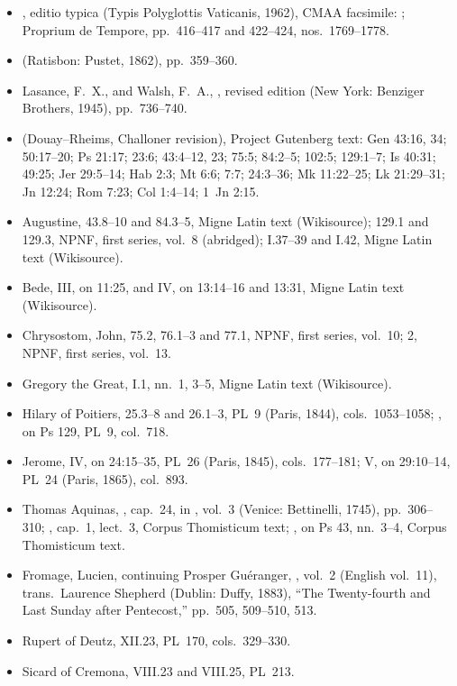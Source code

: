 {\footnotesize
\begin{itemize}[leftmargin=1.2em,itemsep=.15em]
\item {}, editio typica (Typis
Polyglottis Vaticanis, 1962), CMAA facsimile: ;
Proprium de Tempore, pp.~416--417 and 422--424, nos.~1769--1778.
\item {} (Ratisbon: Pustet, 1862), pp.~359--360.
\item Lasance, F.~X., and Walsh, F.~A., , revised edition (New York: Benziger Brothers, 1945), pp.~736--740.
\item {} (Douay--Rheims,
Challoner revision), Project Gutenberg text: Gen 43:16, 34; 50:17--20; Ps
21:17; 23:6; 43:4--12, 23; 75:5; 84:2--5; 102:5; 129:1--7; Is 40:31; 49:25;
Jer 29:5--14; Hab 2:3; Mt 6:6; 7:7; 24:3--36; Mk 11:22--25; Lk 21:29--31;
Jn 12:24; Rom 7:23; Col 1:4--14; 1~Jn 2:15.
\item Augustine,  43.8--10 and 84.3--5,
Migne Latin text (Wikisource); 129.1 and 129.3, NPNF, first series, vol.~8
(abridged);  I.37--39 and I.42, Migne Latin
text (Wikisource).
\item Bede,  III, on 11:25, and IV, on
13:14--16 and 13:31, Migne Latin text (Wikisource).
\item Chrysostom, John,  75.2, 76.1--3 and 77.1,
NPNF, first series, vol.~10;  2, NPNF, first
series, vol.~13.
\item Gregory the Great,  I.1, nn.~1, 3--5, Migne
Latin text (Wikisource).
\item Hilary of Poitiers,  25.3--8
and 26.1--3, PL~9 (Paris, 1844), cols.~1053--1058; , on Ps 129, PL~9, col.~718.
\item Jerome,  IV, on 24:15--35, PL~26 (Paris,
1845), cols.~177--181;  V, on 29:10--14, PL~24 (Paris,
1865), col.~893.
\item Thomas Aquinas, , cap.~24, in
, vol.~3 (Venice: Bettinelli, 1745), pp.~306--310;
, cap.~1, lect.~3, Corpus Thomisticum
text; , on Ps 43, nn.~3--4, Corpus Thomisticum text.
\item Fromage, Lucien, continuing Prosper Guéranger, , vol.~2 (English vol.~11), trans.\ Laurence
Shepherd (Dublin: Duffy, 1883), ``The Twenty-fourth and Last Sunday after
Pentecost,'' pp.~505, 509--510, 513.
\item Rupert of Deutz,  XII.23, PL~170,
cols.~329--330.
\item Sicard of Cremona,  VIII.23 and VIII.25, PL~213.
\end{itemize}
\par}
